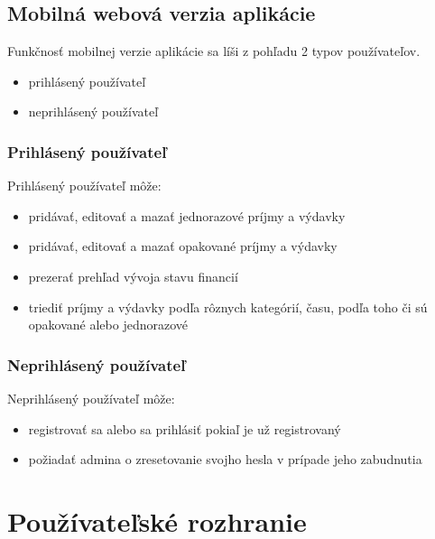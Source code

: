 \documentclass[12pt,oneside]{book}
\begin{document}
\subsection{Mobilná webová verzia aplikácie}
Funkčnosť mobilnej verzie aplikácie sa líši z pohľadu 2 typov používateľov.
\begin{itemize}
\item{prihlásený používateľ}
\item{neprihlásený používateľ}
\end{itemize}

\subsubsection{Prihlásený používateľ}
Prihlásený používateľ môže:
\begin{itemize}
\item{pridávať, editovať a mazať jednorazové príjmy a výdavky}
\item{pridávať, editovať a mazať opakované príjmy a výdavky}
\item{prezerať prehľad vývoja stavu financií}
\item{triediť príjmy a výdavky podľa rôznych kategórií, času, podľa toho či sú opakované alebo jednorazové}
\end{itemize}

\subsubsection{Neprihlásený používateľ}
Neprihlásený používateľ môže:
\begin{itemize}
\item{registrovať sa alebo sa prihlásiť pokiaľ je už registrovaný}
\item{požiadať admina o zresetovanie svojho hesla v prípade jeho zabudnutia}
\end{itemize}

\section{Používateľské rozhranie}
\end{document}
